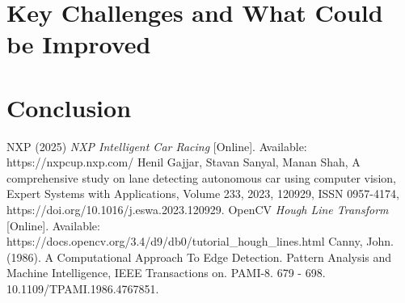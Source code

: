 \documentclass[conference]{IEEEtran}
\begin{document}
\section{Key Challenges and What Could be Improved}

\section{Conclusion}


\begin{thebibliography}{00}
    NXP (2025) \emph{NXP Intelligent Car Racing} [Online]. Available: https://nxpcup.nxp.com/
    Henil Gajjar, Stavan Sanyal, Manan Shah, A comprehensive study on lane detecting autonomous car using computer vision,
    Expert Systems with Applications, Volume 233, 2023, 120929, ISSN 0957-4174, https://doi.org/10.1016/j.eswa.2023.120929.
    OpenCV \emph{Hough Line Transform} [Online]. Available: https://docs.opencv.org/3.4/d9/db0/tutorial\_hough\_lines.html
    Canny, John. (1986). A Computational Approach To Edge Detection. Pattern Analysis and Machine Intelligence, IEEE Transactions on. PAMI-8. 679 - 698. 10.1109/TPAMI.1986.4767851.
    \end{thebibliography}
\end{document}
